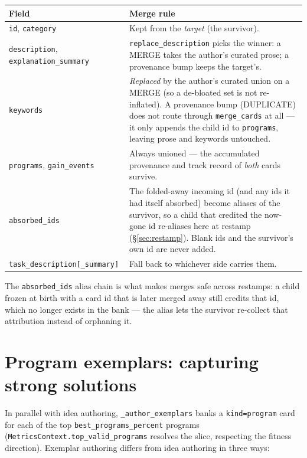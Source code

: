 \documentclass[11pt]{article}
\newcommand{\code}[1]{\texttt{\small #1}}
\begin{document}
\begin{longtable}{@{}p{}p{}@{}}
\toprule
\textbf{Field} & \textbf{Merge rule} \\
\midrule
\endhead
\code{id}, \code{category} & Kept from the \emph{target} (the survivor). \\
\code{description}, \code{explanation\_summary} & \code{replace\_description}
picks the winner: a MERGE takes the author's curated prose; a provenance bump
keeps the target's. \\
\code{keywords} & \emph{Replaced} by the author's curated union on a MERGE (so a
de-bloated set is not re-inflated). A provenance bump (DUPLICATE) does not route
through \code{merge\_cards} at all --- it only appends the child id to
\code{programs}, leaving prose and keywords untouched. \\
\code{programs}, \code{gain\_events} & Always unioned --- the accumulated
provenance and track record of \emph{both} cards survive. \\
\code{absorbed\_ids} & The folded-away incoming id (and any ids it had itself
absorbed) become aliases of the survivor, so a child that credited the now-gone
id re-aliases here at restamp (\S\ref{sec:restamp}). Blank ids and the
survivor's own id are never added. \\
\code{task\_description[\_summary]} & Fall back to whichever side carries them. \\
\bottomrule
\end{longtable}

The \code{absorbed\_ids} alias chain is what makes merges safe across restamps:
a child frozen at birth with a card id that is later merged away still credits
that id, which no longer exists in the bank --- the alias lets the survivor
re-collect that attribution instead of orphaning it.

\section{Program exemplars: capturing strong solutions}
\label{sec:exemplars}

In parallel with idea authoring, \code{\_author\_exemplars} banks a
\code{kind=program} card for each of the top
\code{best\_programs\_percent} programs (\code{MetricsContext.top\_valid\_programs}
resolves the slice, respecting the fitness direction). Exemplar authoring differs
from idea authoring in three ways:
\end{document}
